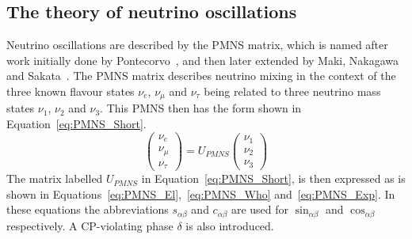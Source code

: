\subsection{The theory of neutrino oscillations} \label{Neut_Oscil}
Neutrino oscillations are described by the PMNS matrix, which is named after work initially done by Pontecorvo~\citep{Pontecorvo1957}, and then later extended by Maki, Nakagawa and Sakata~\citep{PMNS}. The PMNS matrix describes neutrino mixing in the context of the three known flavour states $\nu_e$, $\nu_\mu$ and $\nu_\tau$ being related to three neutrino mass states $\nu_1$, $\nu_2$ and $\nu_3$. This PMNS then has the form shown in Equation~\ref{eq:PMNS_Short}.
\begin{equation}
  \label{eq:PMNS_Short}
  \begin{pmatrix} \nu_e \\ \nu_\mu \\ \nu_\tau \end{pmatrix} = U_{PMNS} \begin{pmatrix} \nu_1 \\ \nu_2 \\ \nu_3 \end{pmatrix}
\end{equation}
The matrix labelled $U_{PMNS}$ in Equation~\ref{eq:PMNS_Short}, is then expressed as is shown in Equations~\ref{eq:PMNS_El},~\ref{eq:PMNS_Who} and~\ref{eq:PMNS_Exp}. In these equations the abbreviations $s_{\alpha\beta}$ and $c_{\alpha\beta}$ are used for $\sin_{\alpha\beta}$ and $\cos_{\alpha\beta}$ respectively. A CP-violating phase $\delta$ is also introduced. \\
